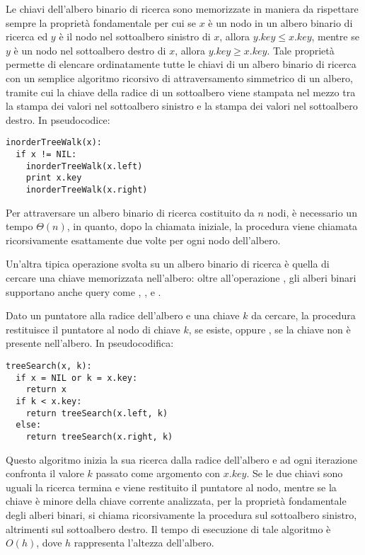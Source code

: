 Le chiavi dell'albero binario di ricerca sono memorizzate in maniera da rispettare sempre la proprietà fondamentale per cui se \(x\) è un nodo in un albero binario di ricerca ed \(y\) è il nodo nel sottoalbero sinistro di \(x\), allora \(y.key \le x.key\), mentre se \(y\) è un nodo nel sottoalbero destro di \(x\), allora \(y.key \ge x.key\). Tale proprietà permette di elencare ordinatamente tutte le chiavi di un albero binario di ricerca con un semplice algoritmo ricorsivo di attraversamento simmetrico di un albero, tramite cui la chiave della radice di un sottoalbero viene stampata nel mezzo tra la stampa dei valori nel sottoalbero sinistro e la stampa dei valori nel sottoalbero destro. In pseudocodice:

\begin{lstlisting}
inorderTreeWalk(x):
  if x != NIL:
    inorderTreeWalk(x.left)
    print x.key
    inorderTreeWalk(x.right)
\end{lstlisting}

Per attraversare un albero binario di ricerca costituito da \(n\) nodi, è necessario un tempo \(\Theta(n)\), in quanto, dopo la chiamata iniziale, la procedura viene chiamata ricorsivamente esattamente due volte per ogni nodo dell'albero. 

\vspace{10pt}

Un'altra tipica operazione svolta su un albero binario di ricerca è quella di cercare una chiave memorizzata nell'albero: oltre all'operazione , gli alberi binari supportano anche query come , ,  e . 

Dato un puntatore alla radice dell'albero e una chiave \(k\) da cercare, la procedura  restituisce il puntatore al nodo di chiave \(k\), se esiste, oppure , se la chiave non è presente nell'albero. In pseudocodifica:

\begin{lstlisting}
treeSearch(x, k):
  if x = NIL or k = x.key:
    return x
  if k < x.key:
    return treeSearch(x.left, k)
  else:
    return treeSearch(x.right, k)
\end{lstlisting}

Questo algoritmo inizia la sua ricerca dalla radice dell'albero e ad ogni iterazione confronta il valore \(k\) passato come argomento con \(x.key\). Se le due chiavi sono uguali la ricerca termina e viene restituito il puntatore al nodo, mentre se la chiave è minore della chiave corrente analizzata, per la proprietà fondamentale degli alberi binari, si chiama ricorsivamente la procedura sul sottoalbero sinistro, altrimenti sul sottoalbero destro. Il tempo di esecuzione di tale algoritmo è \(O(h)\), dove \(h\) rappresenta l'altezza dell'albero. 

